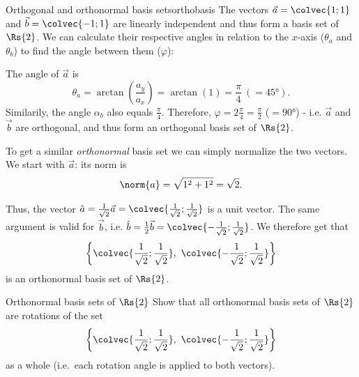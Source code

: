 \begin{example}{Orthogonal and orthonormal basis sets}{orthobasis}
	The vectors $\vec{a}=\colvec{1;1}$ and $\vec{b}=\colvec{-1;1}$ are linearly independent and thus form a basis set of $\Rs{2}$. We can calculate their respective angles in relation to the $x$-axis ($\theta_{a}$ and $\theta_{b}$) to find the angle between them ($\varphi$):

\begin{figure}[H]
	\centering
\end{figure}

The angle of $\vec{a}$ is
\[
	\theta_{a} = \arctan\left( \frac{a_{y}}{a_{x}} \right) = \arctan(1) = \frac{\pi}{4}\ (=\ang{45}).
\]
Similarily, the angle $\alpha_{b}$ also equals $\frac{\pi}{4}$. Therefore, $\varphi=2\frac{\pi}{4}=\frac{\pi}{2}$ ($=\ang{90}$) - i.e. $\vec{a}$ and $\vec{b}$ are orthogonal, and thus form an orthogonal basis set of $\Rs{2}$.

To get a similar \textit{orthonormal} basis set we can simply normalize the two vectors. We start with $\vec{a}$: its norm is
\[
	\norm{a} = \sqrt{1^{2}+1^{2}} = \sqrt{2}.
\]

Thus, the vector $\hat{a}=\frac{1}{\sqrt{2}}\vec{a}=\colvec{\frac{1}{\sqrt{2}};\frac{1}{\sqrt{2}}}$ is a unit vector. The same argument is valid for $\vec{b}$, i.e. $\hat{b}=\frac{1}{2}\vec{b}=\colvec{-\frac{1}{\sqrt{2}};\frac{1}{\sqrt{2}}}$. We therefore get that
\[
	\left\{ \colvec{\frac{1}{\sqrt{2}};\frac{1}{\sqrt{2}}},\ \colvec{-\frac{1}{\sqrt{2}};\frac{1}{\sqrt{2}}} \right\}
\]
is an orthonormal basis set of $\Rs{2}$.
\end{example}

\begin{challenge}{Orthonormal basis sets of $\Rs{2}$}{}
Show that all orthonormal basis sets of $\Rs{2}$ are rotations of the set
\[
	\left\{ \colvec{\frac{1}{\sqrt{2}};\frac{1}{\sqrt{2}}},\ \colvec{-\frac{1}{\sqrt{2}};\frac{1}{\sqrt{2}}} \right\}
\]
as a whole (i.e.\ each rotation angle is applied to both vectors).
\end{challenge}

